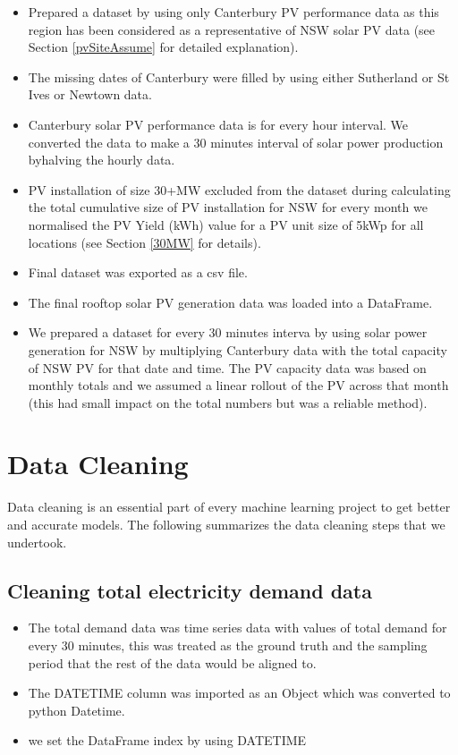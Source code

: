 \documentclass[mstat,12pt]{unswthesis}
\begin{document}
\begin{itemize}
\item Prepared a dataset by using only Canterbury PV performance data as this region has been considered as a representative of NSW solar PV data (see Section \ref{pvSiteAssume} for detailed explanation).  
\item The missing dates of Canterbury were filled by using either Sutherland or St Ives or Newtown data.
\item Canterbury solar PV performance data is for every hour interval. We converted the data to make a 30 minutes interval of solar power production byhalving the hourly data. 
\item PV installation of size 30+MW excluded from the dataset during calculating the total cumulative size of PV installation for NSW for every month\cite{brinsmead_2014_energy} we normalised the PV Yield (kWh) value for a PV unit size of 5kWp for all locations (see Section \ref{30MW} for details).
\item Final dataset was exported as a csv file.
\item The final rooftop solar PV generation data was loaded into a DataFrame.
\item We prepared a dataset for every 30 minutes interva by using solar power generation for NSW by multiplying Canterbury data with the total capacity of NSW PV for that date and time. The PV capacity data was based on monthly totals and we assumed a linear rollout of the PV across that month (this had small impact on the total numbers but was a reliable method).
\end{itemize}

\hypertarget{data-cleaning}{%
\section{Data Cleaning}\label{data-cleaning}}

Data cleaning is an essential part of every machine learning project to
get better and accurate models. The following summarizes the data
cleaning steps that we undertook.

\hypertarget{cleaning-total-electricity-demand-data}{%
\subsection{Cleaning total electricity demand
data}\label{cleaning-total-electricity-demand-data}}

\begin{itemize}
\item The total demand data was time series data with values of total demand for every 30 minutes, this was treated as the ground truth and the sampling period that the rest of the data would be aligned to. 
\item The DATETIME column was imported as an Object which was converted to python Datetime. 
\item we set the DataFrame index by using DATETIME
\end{itemize}
\end{document}
